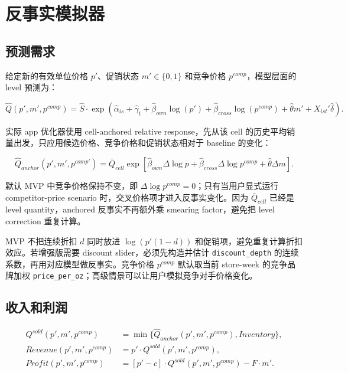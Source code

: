 \documentclass[UTF8,11pt,a4paper,fontset=none]{ctexart}
\begin{document}
\section{反事实模拟器}

\subsection{预测需求}

给定新的有效单位价格 $p'$、促销状态 $m'\in\{0,1\}$ 和竞争价格 $p^{comp}$，模型层面的 level 预测为：

\begin{equation}
\widehat{Q}(p',m',p^{comp})=\widehat{S}\cdot\exp\left(\widehat{\alpha}_{is} + \widehat{\gamma}_t + \widehat{\beta}_{own}\log(p') + \widehat{\beta}_{cross}\log(p^{comp}) + \widehat{\theta}m' + X_{ist}'\widehat{\delta}\right).
\end{equation}

实际 app 优化器使用 cell-anchored relative response，先从该 cell 的历史平均销量出发，只应用候选价格、竞争价格和促销状态相对于 baseline 的变化：

\begin{equation}
\widehat{Q}_{anchor}(p',m',p^{comp\prime})=
\bar{Q}_{cell}\exp\left[
\widehat{\beta}_{own}\Delta\log p
+\widehat{\beta}_{cross}\Delta\log p^{comp}
+\widehat{\theta}\Delta m
\right].
\end{equation}

默认 MVP 中竞争价格保持不变，即 $\Delta\log p^{comp}=0$；只有当用户显式运行 competitor-price scenario 时，交叉价格项才进入反事实变化。因为 $\bar{Q}_{cell}$ 已经是 level quantity，anchored 反事实不再额外乘 smearing factor，避免把 level correction 重复计算。

MVP 不把连续折扣 $d$ 同时放进 $\log(p'(1-d))$ 和促销项，避免重复计算折扣效应。若增强版需要 discount slider，必须先构造并估计 \texttt{discount\_depth} 的连续系数，再用对应模型做反事实。竞争价格 $p^{comp}$ 默认取当前 store-week 的竞争品牌加权 \texttt{price\_per\_oz}；高级情景可以让用户模拟竞争对手价格变化。

\subsection{收入和利润}

\begin{align}
Q^{sold}(p',m',p^{comp}) &= \min\{\widehat{Q}_{anchor}(p',m',p^{comp}), Inventory\},\\
Revenue(p',m',p^{comp}) &= p'\cdot Q^{sold}(p',m',p^{comp}), \\
Profit(p',m',p^{comp}) &= \left[p'-c\right]\cdot Q^{sold}(p',m',p^{comp})-F\cdot m'.
\end{align}
\end{document}
